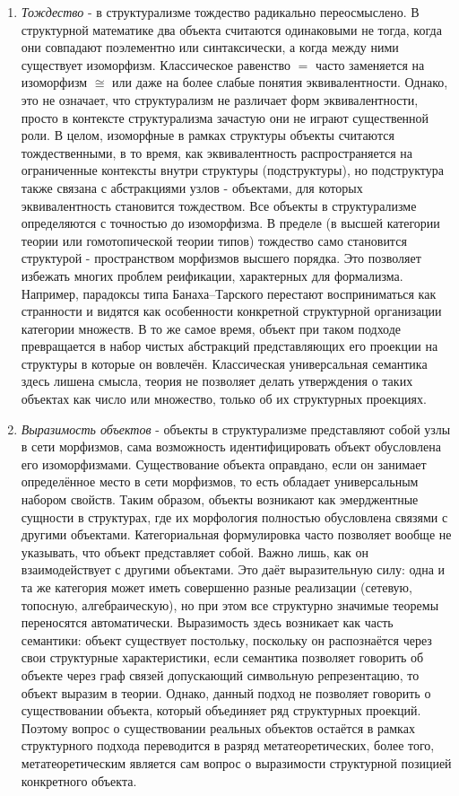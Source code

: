 \documentclass[12pt]{article}
\begin{document}
\begin{enumerate}
    \item {\it Тождество} - в структурализме тождество радикально переосмыслено. В структурной математике два объекта считаются одинаковыми не тогда, когда они совпадают поэлементно или синтаксически, а когда между ними существует изоморфизм. Классическое равенство $=$ часто заменяется на изоморфизм $\cong$ или даже на более слабые понятия эквивалентности. Однако, это не означает, что структурализм не различает форм эквивалентности, просто в контексте структурализма зачастую они не играют существенной роли. В целом, изоморфные в рамках структуры объекты считаются тождественными, в то время, как эквивалентность распространяется на ограниченные контексты внутри структуры (подструктуры), но подструктура также связана с абстракциями узлов - объектами, для которых эквивалентность становится тождеством. Все объекты в структурализме определяются с точностью до изоморфизма. В пределе (в высшей категории теории или гомотопической теории типов) тождество само становится структурой - пространством морфизмов высшего порядка. Это позволяет избежать многих проблем реификации, характерных для формализма. Например, парадоксы типа Банаха–Тарского перестают восприниматься как странности и видятся как особенности конкретной структурной организации категории множеств. В то же самое время, объект при таком подходе превращается в набор чистых абстракций представляющих его проекции на структуры в которые он вовлечён. Классическая универсальная семантика здесь лишена смысла, теория не позволяет делать утверждения о таких объектах как число или множество, только об их структурных проекциях. 
    \item {\it Выразимость объектов} - объекты в структурализме представляют собой узлы в сети морфизмов, сама возможность идентифицировать объект обусловлена его изоморфизмами. Существование объекта оправдано, если он занимает определённое место в сети морфизмов, то есть обладает универсальным набором свойств. Таким образом, объекты возникают как эмерджентные сущности в структурах, где их морфология полностью обусловлена связями с другими объектами. Категориальная формулировка часто позволяет вообще не указывать, что объект представляет собой. Важно лишь, как он взаимодействует с другими объектами. Это даёт выразительную силу: одна и та же категория может иметь совершенно разные реализации (сетевую, топосную, алгебраическую), но при этом все структурно значимые теоремы переносятся автоматически. Выразимость здесь возникает как часть семантики: объект существует постольку, поскольку он распознаётся через свои структурные характеристики, если семантика позволяет говорить об объекте через граф связей допускающий символьную репрезентацию, то объект выразим в теории. Однако, данный подход не позволяет говорить о существовании объекта, который объединяет ряд структурных проекций. Поэтому вопрос о существовании реальных объектов остаётся в рамках структурного подхода переводится в разряд метатеоретических, более того, метатеоретическим является сам вопрос о выразимости структурной позицией конкретного объекта.

\end{enumerate}
\end{document}
